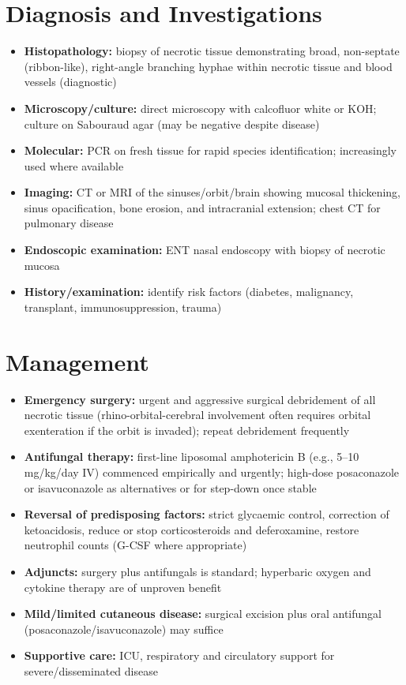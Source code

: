\section*{Diagnosis and Investigations}
\begin{itemize}
    \item \textbf{Histopathology:} biopsy of necrotic tissue demonstrating broad, non-septate (ribbon-like), right-angle branching hyphae within necrotic tissue and blood vessels (diagnostic)
    \item \textbf{Microscopy/culture:} direct microscopy with calcofluor white or KOH; culture on Sabouraud agar (may be negative despite disease)
    \item \textbf{Molecular:} PCR on fresh tissue for rapid species identification; increasingly used where available
    \item \textbf{Imaging:} CT or MRI of the sinuses/orbit/brain showing mucosal thickening, sinus opacification, bone erosion, and intracranial extension; chest CT for pulmonary disease
    \item \textbf{Endoscopic examination:} ENT nasal endoscopy with biopsy of necrotic mucosa
    \item \textbf{History/examination:} identify risk factors (diabetes, malignancy, transplant, immunosuppression, trauma)
\end{itemize}

\section*{Management}
\begin{itemize}
    \item \textbf{Emergency surgery:} urgent and aggressive surgical debridement of all necrotic tissue (rhino-orbital-cerebral involvement often requires orbital exenteration if the orbit is invaded); repeat debridement frequently
    \item \textbf{Antifungal therapy:} first-line liposomal amphotericin B (e.g., 5--10 mg/kg/day IV) commenced empirically and urgently; high-dose posaconazole or isavuconazole as alternatives or for step-down once stable
    \item \textbf{Reversal of predisposing factors:} strict glycaemic control, correction of ketoacidosis, reduce or stop corticosteroids and deferoxamine, restore neutrophil counts (G-CSF where appropriate)
    \item \textbf{Adjuncts:} surgery plus antifungals is standard; hyperbaric oxygen and cytokine therapy are of unproven benefit
    \item \textbf{Mild/limited cutaneous disease:} surgical excision plus oral antifungal (posaconazole/isavuconazole) may suffice
    \item \textbf{Supportive care:} ICU, respiratory and circulatory support for severe/disseminated disease
\end{itemize}

